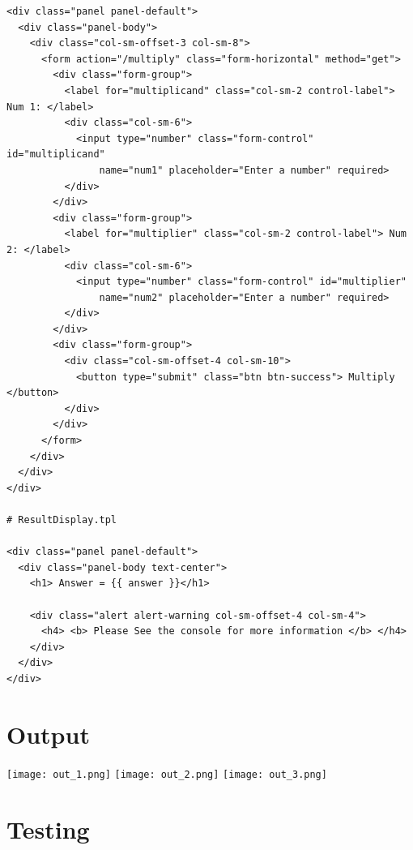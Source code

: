 \documentclass[10pt,a4paper]{article}
\newenvironment{changemargin}[2]{%
\begin{list}{}{%
\setlength{\topsep}{0pt}%
\setlength{\leftmargin}{#1}%
\setlength{\rightmargin}{#2}%
\setlength{\listparindent}{\parindent}%
\setlength{\itemindent}{\parindent}%
\setlength{\parsep}{\parskip}%
}%
\item[]}{\end{list}}
\begin{document}
\begin{changemargin}{-4cm}{-4cm}
\begin{lstlisting}
<div class="panel panel-default">
  <div class="panel-body">
    <div class="col-sm-offset-3 col-sm-8">
      <form action="/multiply" class="form-horizontal" method="get">
        <div class="form-group">
          <label for="multiplicand" class="col-sm-2 control-label"> Num 1: </label>
          <div class="col-sm-6">
            <input type="number" class="form-control" id="multiplicand"
                name="num1" placeholder="Enter a number" required>
          </div>
        </div>
        <div class="form-group">
          <label for="multiplier" class="col-sm-2 control-label"> Num 2: </label>
          <div class="col-sm-6">
            <input type="number" class="form-control" id="multiplier"
                name="num2" placeholder="Enter a number" required>
          </div>
        </div>
        <div class="form-group">
          <div class="col-sm-offset-4 col-sm-10">
            <button type="submit" class="btn btn-success"> Multiply </button>
          </div>
        </div>
      </form>
    </div>
  </div>
</div>

# ResultDisplay.tpl

<div class="panel panel-default">
  <div class="panel-body text-center">
    <h1> Answer = {{ answer }}</h1>

    <div class="alert alert-warning col-sm-offset-4 col-sm-4">
      <h4> <b> Please See the console for more information </b> </h4>
    </div>
  </div>
</div>

\end{lstlisting}
\end{changemargin}


\section{Output}
\texttt{[image: out\_1.png]}
\texttt{[image: out\_2.png]}
\texttt{[image: out\_3.png]}

\section{Testing}
\end{document}
